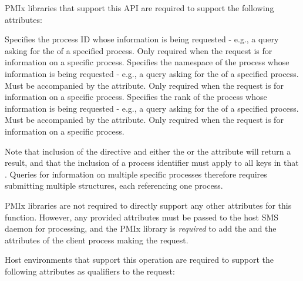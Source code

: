 \reqattrstart
\ac{PMIx} libraries that support this \ac{API} are required to support the following attributes:

 Specifies the process ID whose information is being requested - e.g., a query asking for the  of a specified process. Only required when the request is for information on a specific process.
\pastePRIAttributeItemEnd
{} Specifies the namespace of the process whose information is being requested - e.g., a query asking for the  of a specified process. Must be accompanied by the  attribute. Only required when the request is for information on a specific process.
\pastePRIAttributeItemEnd
{} Specifies the rank of the process whose information is being requested - e.g., a query asking for the  of a specified process. Must be accompanied by the  attribute. Only required when the request is for information on a specific process.
\pastePRIAttributeItemEnd
{}

Note that inclusion of the  directive and either the  or the  attribute will return a  result, and that the inclusion of a process identifier must apply to all keys in that . Queries for information on multiple specific processes therefore requires submitting multiple  structures, each referencing one process.

\ac{PMIx} libraries are not required to directly support any other attributes for this function. However, any provided attributes must be passed to the host \ac{SMS} daemon for processing, and the \ac{PMIx} library is \textit{required} to add the  and the  attributes of the client process making the request.

\divider

Host environments that support this operation are required to support the following attributes as qualifiers to the request:

